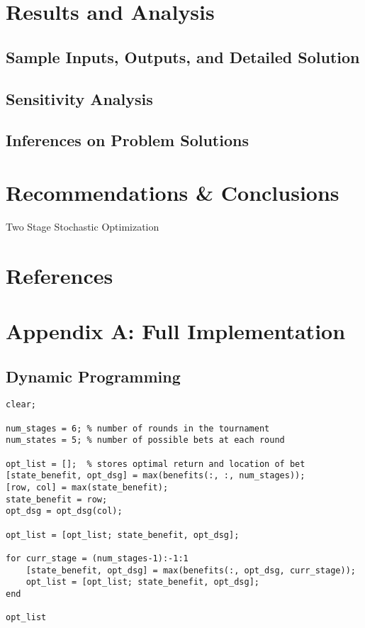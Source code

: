 \documentclass[12pt]{article}
\begin{document}
\section{Results and Analysis}
\subsection{Sample Inputs, Outputs, and Detailed Solution}


\subsection{Sensitivity Analysis}


\subsection{Inferences on Problem Solutions}

\newpage
\section{Recommendations \& Conclusions}
Two Stage Stochastic Optimization

\newpage
\section{References}



\newpage
\section{Appendix A: Full Implementation}
\subsection{Dynamic Programming}
\begin{verbatim}
clear;

num_stages = 6;	% number of rounds in the tournament
num_states = 5;	% number of possible bets at each round

opt_list = [];	% stores optimal return and location of bet
[state_benefit, opt_dsg] = max(benefits(:, :, num_stages));
[row, col] = max(state_benefit);
state_benefit = row;
opt_dsg = opt_dsg(col);

opt_list = [opt_list; state_benefit, opt_dsg];

for curr_stage = (num_stages-1):-1:1
	[state_benefit, opt_dsg] = max(benefits(:, opt_dsg, curr_stage));
	opt_list = [opt_list; state_benefit, opt_dsg];
end

opt_list
\end{verbatim}
\end{document}
